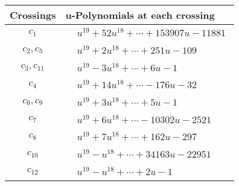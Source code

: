 \documentclass[1p]{elsarticle_modified}
\theoremstyle{definition}
\begin{document}
\begin{tabular}{m{50pt}|m{274pt}}
Crossings & \hspace{64pt}u-Polynomials at each crossing \\
\hline $$\begin{aligned}c_{1}\end{aligned}$$&$\begin{aligned}
&u^{19}+52 u^{18}+\cdots+153907 u-11881
\end{aligned}$\\
\hline $$\begin{aligned}c_{2},c_{5}\end{aligned}$$&$\begin{aligned}
&u^{19}+2 u^{18}+\cdots+251 u-109
\end{aligned}$\\
\hline $$\begin{aligned}c_{3},c_{11}\end{aligned}$$&$\begin{aligned}
&u^{19}-3 u^{18}+\cdots+6 u-1
\end{aligned}$\\
\hline $$\begin{aligned}c_{4}\end{aligned}$$&$\begin{aligned}
&u^{19}+14 u^{18}+\cdots-176 u-32
\end{aligned}$\\
\hline $$\begin{aligned}c_{6},c_{9}\end{aligned}$$&$\begin{aligned}
&u^{19}+3 u^{18}+\cdots+5 u-1
\end{aligned}$\\
\hline $$\begin{aligned}c_{7}\end{aligned}$$&$\begin{aligned}
&u^{19}+6 u^{18}+\cdots-10302 u-2521
\end{aligned}$\\
\hline $$\begin{aligned}c_{8}\end{aligned}$$&$\begin{aligned}
&u^{19}+7 u^{18}+\cdots+162 u-297
\end{aligned}$\\
\hline $$\begin{aligned}c_{10}\end{aligned}$$&$\begin{aligned}
&u^{19}- u^{18}+\cdots+34163 u-22951
\end{aligned}$\\
\hline $$\begin{aligned}c_{12}\end{aligned}$$&$\begin{aligned}
&u^{19}- u^{18}+\cdots+2 u-1
\end{aligned}$\\
\hline
\end{tabular}\\~\\
\end{document}

